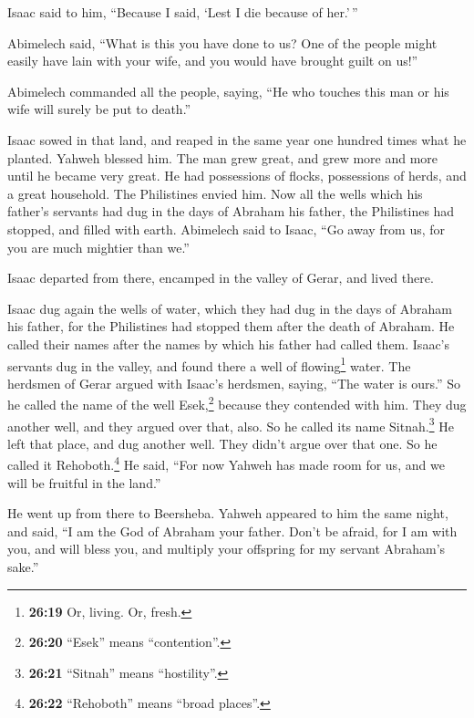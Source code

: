 Isaac said to him, ``Because I said, `Lest I die because of her.'\,''

 Abimelech said, ``What is this you have done to us? One
of the people might easily have lain with your wife, and you would have
brought guilt on us!''

 Abimelech commanded all the people, saying, ``He who
touches this man or his wife will surely be put to death.''

 Isaac sowed in that land, and reaped in the same year
one hundred times what he planted. Yahweh blessed him. 
The man grew great, and grew more and more until he became very great.
 He had possessions of flocks, possessions of herds, and
a great household. The Philistines envied him.  Now all
the wells which his father's servants had dug in the days of Abraham his
father, the Philistines had stopped, and filled with earth.
 Abimelech said to Isaac, ``Go away from us, for you are
much mightier than we.''

 Isaac departed from there, encamped in the valley of
Gerar, and lived there.

 Isaac dug again the wells of water, which they had dug
in the days of Abraham his father, for the Philistines had stopped them
after the death of Abraham. He called their names after the names by
which his father had called them.  Isaac's servants dug
in the valley, and found there a well of flowing\footnote{\textbf{26:19}
  Or, living. Or, fresh.} water.  The herdsmen of Gerar
argued with Isaac's herdsmen, saying, ``The water is ours.'' So he
called the name of the well Esek,\footnote{\textbf{26:20} ``Esek'' means
  ``contention''.} because they contended with him.  They
dug another well, and they argued over that, also. So he called its name
Sitnah.\footnote{\textbf{26:21} ``Sitnah'' means ``hostility''.}
 He left that place, and dug another well. They didn't
argue over that one. So he called it Rehoboth.\footnote{\textbf{26:22}
  ``Rehoboth'' means ``broad places''.} He said, ``For now Yahweh has
made room for us, and we will be fruitful in the land.''

 He went up from there to Beersheba. 
Yahweh appeared to him the same night, and said, ``I am the God of
Abraham your father. Don't be afraid, for I am with you, and will bless
you, and multiply your offspring for my servant Abraham's sake.''

